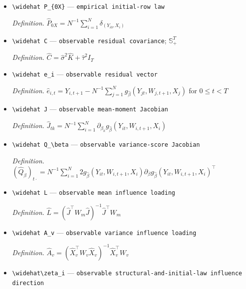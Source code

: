 \documentclass{article}
\begin{document}
\begin{itemize}
  \par\smallskip\noindent\emph{Definition.} \(\widehat K_{rs}=N^{-1}\sum_{i=1}^Ng_{\widehat\beta}(Y_{ir},W_{i,r+1},X_i)g_{\widehat\beta}(Y_{is},W_{i,s+1},X_i)\)
  \item \texttt{\textbackslash{}\allowbreak{}widehat P\_\allowbreak{}\{0X\}\allowbreak{}} --- \texttt{empirical initial-\allowbreak{}row law}
  \par\smallskip\noindent\emph{Definition.} \(\widehat P_{0X}=N^{-1}\sum_{i=1}^N\delta_{(Y_{i0},X_i)}\)
  \item \texttt{\textbackslash{}\allowbreak{}widehat C} --- \texttt{observable residual covariance}; \(\mathbb S_+^T\)
  \par\smallskip\noindent\emph{Definition.} \(\widehat C=\widehat\sigma^2\widehat K+\widehat\tau^2I_T\)
  \item \texttt{\textbackslash{}\allowbreak{}widehat e\_\allowbreak{}i} --- \texttt{observable residual vector}
  \par\smallskip\noindent\emph{Definition.} \(\widehat e_{i,t}=Y_{i,t+1}-N^{-1}\sum_{j=1}^Ng_{\widehat\beta}(Y_{jt},W_{j,t+1},X_j)\) for \(0\le t<T\)
  \item \texttt{\textbackslash{}\allowbreak{}widehat J} --- \texttt{observable mean-\allowbreak{}moment Jacobian}
  \par\smallskip\noindent\emph{Definition.} \(\widehat J_{tk}=N^{-1}\sum_{i=1}^N\partial_{\beta_k}g_{\widehat\beta}(Y_{it},W_{i,t+1},X_i)\)
  \item \texttt{\textbackslash{}\allowbreak{}widehat Q\_\allowbreak{}\textbackslash{}\allowbreak{}beta} --- \texttt{observable variance-\allowbreak{}score Jacobian}
  \par\smallskip\noindent\emph{Definition.} \((\widehat Q_\beta)_{t\cdot}=N^{-1}\sum_{i=1}^N2g_{\widehat\beta}(Y_{it},W_{i,t+1},X_i)\partial_\beta g_{\widehat\beta}(Y_{it},W_{i,t+1},X_i)^{\top}\)
  \item \texttt{\textbackslash{}\allowbreak{}widehat L} --- \texttt{observable mean influence loading}
  \par\smallskip\noindent\emph{Definition.} \(\widehat L=(\widehat J^{\top}W_m\widehat J)^{-1}\widehat J^{\top}W_m\)
  \item \texttt{\textbackslash{}\allowbreak{}widehat A\_\allowbreak{}v} --- \texttt{observable variance influence loading}
  \par\smallskip\noindent\emph{Definition.} \(\widehat A_v=(\widehat X_v^{\top}W_v\widehat X_v)^{-1}\widehat X_v^{\top}W_v\)
  \item \texttt{\textbackslash{}\allowbreak{}widehat\textbackslash{}\allowbreak{}zeta\_\allowbreak{}i} --- \texttt{observable structural-\allowbreak{}and-\allowbreak{}initial-\allowbreak{}law influence direction}

\end{itemize}
\end{document}
